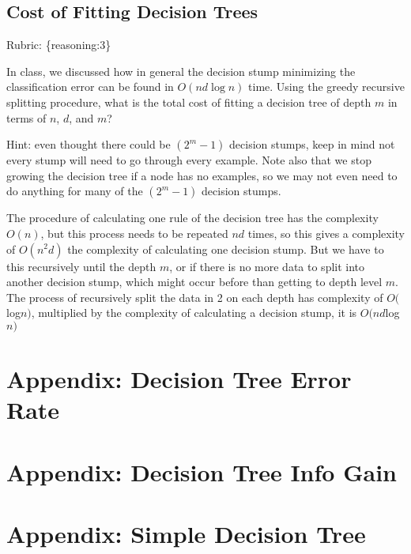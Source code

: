 \documentclass{article}
\def\rubric#1{\gre{Rubric: \{#1\}}}{}
\def\blu#1{{\color{blu}#1}}
\def\gre#1{{\color{gre}#1}}
\def\ans#1{{\color{ans}#1}}
\begin{document}
\subsection{Cost of Fitting Decision Trees}
\rubric{reasoning:3}

In class, we discussed how in general the decision stump minimizing the classification error can be found in $O(nd\log n)$ time.
Using the greedy recursive splitting procedure, \blu{what is the total cost of fitting a decision tree of depth $m$ in terms of $n$, $d$, and $m$?}

Hint: even thought there could be $(2^m-1)$ decision stumps, keep in mind not every stump will need to go through every example. Note also that we stop growing the decision tree if a node has no examples, so we may not even need to do anything for many of the $(2^m-1)$ decision stumps.

\ans{
    The procedure of calculating one rule of the decision tree has the complexity $O(n)$, but this process needs to be repeated $nd$ times, so this gives a complexity of $O(n^2d)$ the complexity of calculating one decision stump. But we have to this recursively until the depth $m$, or if there is no more data to split into another decision stump, which might occur before than getting to depth level $m$. The process of recursively split the data in 2 on each depth has complexity of $O($log$ n)$, multiplied by the complexity of calculating a decision stump, it is $O(nd$log$ n)$
}


\appendix

\section{Appendix: Decision Tree Error Rate}
\label{appendix:DecisionStumpErrorRate}
\begin{center}
    
\end{center}

\section{Appendix: Decision Tree Info Gain}
\label{appendix:DecisionStumpInfoGain}
\begin{center}
    
\end{center}

\section{Appendix: Simple Decision Tree}
\label{appendix:DecisionStumpHardCoded}
\begin{center}
    
\end{center}
\end{document}
